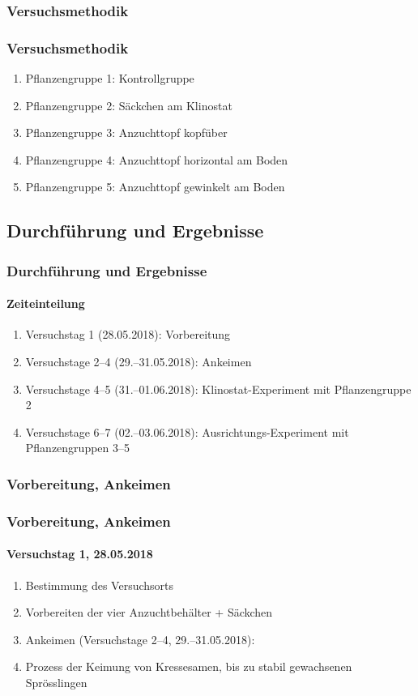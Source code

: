 \documentclass[aspectratio=169
]{beamer}
\begin{document}
	\subsubsection{Versuchsmethodik}
	
	\begin{frame}[<+(1)->]
		\frametitle{Versuchsmethodik}
\begin{enumerate}
\item Pflanzengruppe 1: Kontrollgruppe
\item Pflanzengruppe 2: Säckchen am Klinostat
\item Pflanzengruppe 3: Anzuchttopf kopfüber
\item Pflanzengruppe 4: Anzuchttopf horizontal am Boden
\item Pflanzengruppe 5: Anzuchttopf gewinkelt am Boden 
\end{enumerate}
		
	\end{frame}
	
\subsection{Durchführung und Ergebnisse}
	
\begin{frame}[<+(1)->]
\frametitle{Durchführung und Ergebnisse}
\framesubtitle{Zeiteinteilung}
		
\begin{enumerate}
\item Versuchstag 1 (28.05.2018): Vorbereitung
\item Versuchstage 2--4 (29.--31.05.2018): Ankeimen
\item Versuchstage 4--5 (31.--01.06.2018): Klinostat-Experiment mit Pflanzengruppe 2
\item Versuchstage 6--7 (02.--03.06.2018): Ausrichtungs-Experiment mit Pflanzengruppen 3--5
\end{enumerate}
\end{frame}
	
\subsubsection{Vorbereitung, Ankeimen}

\begin{frame}[<+(1)->]
\frametitle{Vorbereitung, Ankeimen}
\framesubtitle{Versuchstag 1, 28.05.2018}
		
\begin{enumerate}
\item Bestimmung des Versuchsorts
\item Vorbereiten der vier Anzuchtbehälter + Säckchen 
\item Ankeimen (Versuchstage 2--4, 29.--31.05.2018):
\item Prozess der Keimung von Kressesamen, bis zu stabil gewachsenen Sprösslingen
\end{enumerate}
\end{frame}
	
\end{document}
